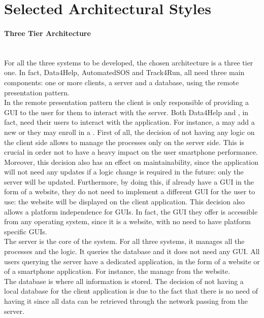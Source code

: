 \documentclass[../../DD.tex]{subfiles}
\begin{document}
\section{Selected Architectural Styles}
	\paragraph{Three Tier Architecture}\mbox{}\\
	For all the three systems to be developed, the chosen architecture is a three tier one. In fact, Data4Help, AutomatedSOS and Track4Run, all need three main components: one or more clients, a server and a database, using the remote presentation pattern.\\
	In the remote presentation pattern the client is only responsible of providing a GUI to the user for them to interact with the server. Both Data4Help and , in fact, need their users to interact with the application. For instance, a  may add a new  or they may enroll in a . First of all, the decision of not having any logic on the client side allows to manage the processes only on the server side. This is crucial in order not to have a heavy impact on the user smartphone performance. Moreover, this decision also has an effect on maintainability, since the application will not need any updates if a logic change is required in the future: only the server will be updated. Furthermore, by doing this, if  already have a GUI in the form of a website, they do not need to implement a different GUI for the user to use: the  website will be displayed on the client application. This decision also allows a platform independence for  GUIs. In fact, the GUI they offer is accessible from any operating system, since it is a website, with no need to have platform specific GUIs.\\
	The server is the core of the system. For all three systems, it manages all the processes and the logic. It queries the database and it does not need any GUI. All users querying the server have a dedicated application, in the form of a website or of a smartphone application. For instance, the  manage  from the  website.\\
	The database is where all information is stored. The decision of not having a local database for the client application is due to the fact that there is no need of having it since all data can be retrieved through the network passing from the server.
\end{document}
